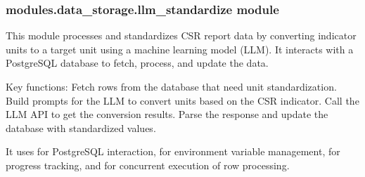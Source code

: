 \documentclass[letterpaper,10pt,english]{sphinxmanual}
\begin{document}
\subsubsection{modules.data\_storage.llm\_standardize module}
\label{\detokenize{modules.data_storage:module-modules.data_storage.llm_standardize}}\label{\detokenize{modules.data_storage:modules-data-storage-llm-standardize-module}}
\sphinxAtStartPar
This module processes and standardizes CSR report data by converting indicator units
to a target unit using a machine learning model (LLM). It interacts with a PostgreSQL
database to fetch, process, and update the data.

\sphinxAtStartPar
Key functions:
\sphinxhyphen{} Fetch rows from the database that need unit standardization.
\sphinxhyphen{} Build prompts for the LLM to convert units based on the CSR indicator.
\sphinxhyphen{} Call the LLM API to get the conversion results.
\sphinxhyphen{} Parse the response and update the database with standardized values.

\sphinxAtStartPar
It uses  for PostgreSQL interaction,  for environment variable management,
 for progress tracking, and  for concurrent execution of row processing.
\end{document}
